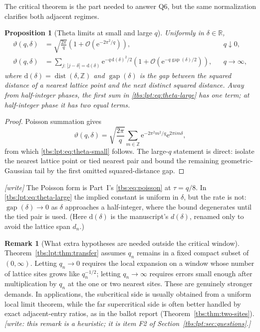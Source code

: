 \documentclass[11pt,a4paper]{article}
\numberwithin{equation}{section}
\newtheorem{proposition}[theorem]{Proposition}
\theoremstyle{definition}
\newtheorem{remark}[theorem]{Remark}
\newcommand{\Z}{\mathbb Z}
\newcommand{\R}{\mathbb R}
\newcommand{\ee}{\mathrm e}
\newcommand{\OO}{\mathcal O}
\DeclareMathOperator{\dist}{dist}
\begin{document}
The critical theorem is the part needed to answer Q6, but the same
normalization clarifies both adjacent regimes.

\begin{proposition}[Theta limits at small and large $q$]\label{tbs:lpt:prop:theta-regimes}
Uniformly in $\delta\in\R$,
\begin{align}
 \vartheta(q,\delta)&=\sqrt{\frac{2\pi}{q}}\left(1+\OO\left(\ee^{-2\pi^2/q}\right)\right),&&q\downarrow0,\label{tbs:lpt:eq:theta-small}\\
 \vartheta(q,\delta)&=\sum_{j:\,|j-\delta|=\mathrm{d}(\delta)}\ee^{-q\,\mathrm{d}(\delta)^2/2}
 \left(1+\OO\left(\ee^{-q\operatorname{gap}(\delta)/2}\right)\right),&&q\to\infty,\label{tbs:lpt:eq:theta-large}
\end{align}
where $\mathrm{d}(\delta)=\dist(\delta,\Z)$ and $\operatorname{gap}(\delta)$
is the gap between the squared distance of a nearest lattice point and
the next distinct squared distance. Away from half-integer phases, the
first sum in \eqref{tbs:lpt:eq:theta-large} has one term; at half-integer
phase it has two equal terms.
\end{proposition}

\begin{proof}
Poisson summation gives
\[
 \vartheta(q,\delta)=\sqrt{\frac{2\pi}{q}}
 \sum_{m\in\Z}\ee^{-2\pi^2m^2/q}\ee^{2\pi i m\delta},
\]
from which \eqref{tbs:lpt:eq:theta-small} follows. The large-$q$
statement is direct: isolate the nearest lattice point or tied nearest
pair and bound the remaining geometric-Gaussian tail by the first omitted
squared-distance gap.
\end{proof}

\emph{[write]} The Poisson form is Part~I's \eqref{tbs:eq:poisson} at
$\tau=q/8$. In \eqref{tbs:lpt:eq:theta-large} the implied constant is
uniform in $\delta$, but the rate is not: $\operatorname{gap}(\delta)\to0$
as $\delta$ approaches a half-integer, where the bound degenerates until
the tied pair is used. (Here $\mathrm{d}(\delta)$ is the manuscript's
$d(\delta)$, renamed only to avoid the lattice span $d_n$.)

\begin{remark}[What extra hypotheses are needed outside the critical window]\label{tbs:lpt:rem:outside}
Theorem~\ref{tbs:lpt:thm:transfer} assumes $q_n$ remains in a fixed
compact subset of $(0,\infty)$. Letting $q_n\to0$ requires the local
expansion on a window whose number of lattice sites grows like
$q_n^{-1/2}$; letting $q_n\to\infty$ requires errors small enough after
multiplication by $q_n$ at the one or two nearest sites. These are
genuinely stronger demands. In applications, the subcritical side is
usually obtained from a uniform local limit theorem, while the far
supercritical side is often better handled by exact adjacent-entry
ratios, as in the ballot report (Theorem~\ref{tbs:thm:two-sites}).
\emph{[write: this remark is a heuristic; it is item F2 of
Section~\ref{tbs:lpt:sec:questions}.]}
\end{remark}
\end{document}
